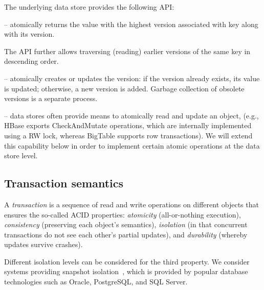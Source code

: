 The underlying data store provides the following API:
\begin{description}
\item [] -- atomically returns the value with
the highest version associated with key along with its version.
\item The API further allows traversing (reading) earlier versions of the same
key in descending order.
\item [\code{write(key,value,version)}] -- atomically creates or updates the version:
if the version already exists, its value is updated;
otherwise, a new version is added. Garbage collection of obsolete versions is a separate
process.
\item [Read-modify-write] --  data stores often provide means to atomically read and
update an object, (e.g., HBase exports CheckAndMutate operations, which are 
internally implemented using a RW lock, whereas BigTable supports row transactions). We
will extend this capability below in order to implement certain atomic
operations at the data store level.
\end{description}

\subsection{Transaction semantics} \label{ssec:transactions}

A \emph{transaction} is a sequence of read and write operations on different objects that ensures the so-called ACID properties:
\emph{atomicity} (all-or-nothing execution), \emph{consistency} (preserving each object's semantics), 
\emph{isolation} (in that concurrent transactions do not see each other's partial updates), and 
\emph{durability} (whereby updates survive crashes).

Different isolation levels can be considered for the third property. We consider systems providing  
snapshot isolation~\cite{DBLP:conf/sigmod/BerensonBGMOO95}, 
which is provided by popular database technologies such as Oracle, PostgreSQL, and SQL Server.

